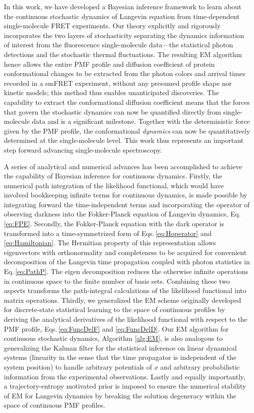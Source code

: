 \documentclass[journal=jpcbfk,manuscript=article,layout=twocolumn,articletitle=true]{achemso}
\begin{document}
In this work, we have developed a Bayesian inference framework to learn about the continuous stochastic dynamics of Langevin equation from time-dependent single-molecule FRET experiments. Our theory explicitly and rigorously incorporates the two layers of stochasticity separating the dynamics information of interest from the fluorescence single-molecule data---the statistical photon detections and the stochastic thermal fluctuations. The resulting EM algorithm hence allows the entire PMF profile and diffusion coefficient of protein conformational changes to be extracted from the photon colors and arrival times recorded in a smFRET experiment, without any presumed profile shape nor kinetic models; this method thus enables unanticipated discoveries. The capability to extract the conformational diffusion coefficient means that the forces that govern the stochastic dynamics can now be quantified directly from single-molecule data and is a significant milestone. Together with the deterministic force given by the PMF profile, the conformational {\em dynamics} can now be quantitatively determined at the single-molecule level. This work thus represents an important step forward advancing single-molecule spectroscopy.

A series of analytical and numerical advances has been accomplished to achieve the capability of Bayesian inference for continuous dynamics. Firstly, the numerical path integration of the likelihood functional, which would have involved bookkeeping infinite terms for continuous dynamics, is made possible by integrating forward the time-independent terms and incorporating the operator of observing darkness into the Fokker-Planck equation of Langevin dynamics, Eq.\,\ref{eq:FPE}. Secondly, the Fokker-Planck equation with the dark operator is transformed into a time-symmetrized form of Eqs.\,\ref{eq:Hoperator} and \ref{eq:Hamiltonian}. The Hermitian property of this representation allows eigenvectors with orthonormality and completeness to be acquired for convenient decomposition of the Langevin time propagation coupled with photon statistics in Eq.\,\ref{eq:PathP}. The eigen decomposition reduces the otherwise infinite operations in continuous space to the finite number of basis sets. Combining these two aspects transforms the path-integral calculations of the likelihood functional into matrix operations. Thirdly, we generalized the EM scheme originally developed for discrete-state statistical learning to the space of continuous profiles by deriving the analytical derivatives of the likelihood functional with respect to the PMF profile, Eqs.\,\ref{eq:FuncDelF} and \ref{eq:FuncDelD}. Our EM algorithm for continuous stochastic dynamics, Algorithm \ref{alg:EM}, is also analogous to generalizing the Kalman filter for the statistical inference on linear dynamical systems (linearity in the sense that the time propagator is independent of the system position\cite{Wainwright:2007du,Anonymous:Ejt2aS2v}) to handle arbitrary potentials of $x$ and arbitrary probabilistic information from the experimental observations. Lastly and equally importantly, a trajectory-entropy motivated prior is imposed to ensure the numerical stability of EM for Langevin dynamics by breaking the solution degeneracy within the space of continuous PMF profiles.
\end{document}
